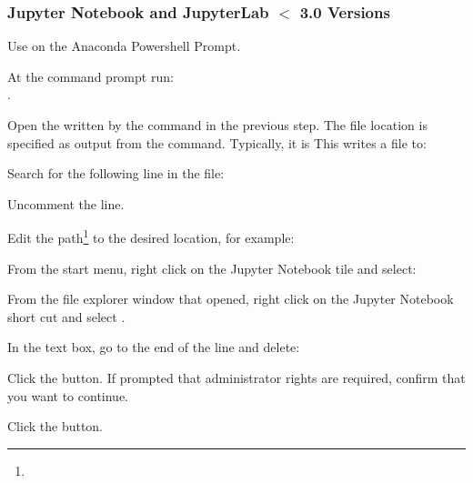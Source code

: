 	\subsubsection{Jupyter Notebook and JupyterLab $<$ 3.0 Versions}
	\begin{numberedlist}
		\item Use  on the Anaconda Powershell Prompt.
		\item At the command prompt run:\\ . \label{nl:jupyterstartupfoldergenerateconfiguration}
		\item Open the written by the command in the previous step.  The file location is specified as output from the command.  Typically, it is This writes a file to:\\  \label{nl:jupyterstartupfolderconfigurationfile}
		\item Search for the following line in the file:\\  \label{nl:jupyterstartupfoldersearchforline}
		\item Uncomment the line.
		\item Edit the path\footnote{} to the desired location, for example:\\   \label{nl:jupyterstartupfoldereditpath}
		\item From the start menu, right click on the Jupyter Notebook tile and select:\\ 
		\item From the file explorer window that opened, right click on the Jupyter Notebook short cut and select .
		\item In the  text box, go to the end of the line and delete:\\ 
		\item Click the  button.  If prompted that administrator rights are required, confirm that you want to continue.
		\item Click the  button.
	\end{numberedlist}

